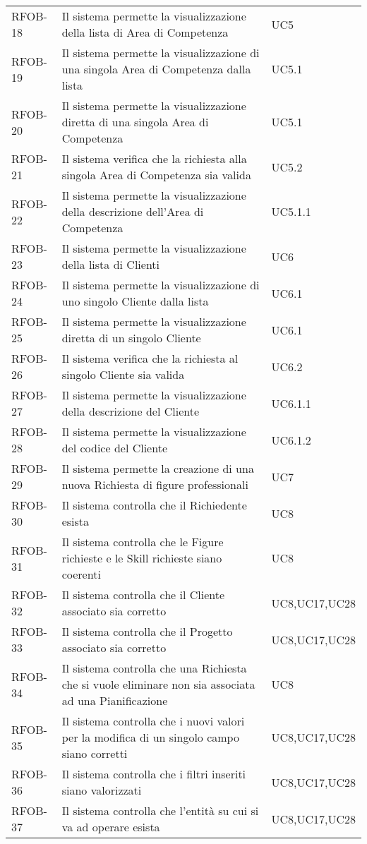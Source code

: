 \begin{center}
\begin{longtable}{p{2.0cm}|p{8cm}|p{2.7cm}}
RFOB-18  & Il sistema permette la visualizzazione della lista di Area di Competenza & UC5 \\ 
RFOB-19  & Il sistema permette la visualizzazione di una singola Area di Competenza dalla lista & UC5.1 \\ 
RFOB-20  & Il sistema permette la visualizzazione diretta di una singola Area di Competenza & UC5.1 \\ 
RFOB-21  & Il sistema verifica che la richiesta alla singola Area di Competenza sia valida & UC5.2 \\ 
RFOB-22  & Il sistema permette la visualizzazione della descrizione dell'Area di Competenza & UC5.1.1 \\ 
RFOB-23  & Il sistema permette la visualizzazione della lista di Clienti & UC6 \\ 
RFOB-24  & Il sistema permette la visualizzazione di uno singolo Cliente dalla lista & UC6.1 \\ 
RFOB-25  & Il sistema permette la visualizzazione diretta di un singolo Cliente & UC6.1 \\ 
RFOB-26  & Il sistema verifica che la richiesta al singolo Cliente sia valida & UC6.2 \\ 
RFOB-27  & Il sistema permette la visualizzazione della descrizione del Cliente & UC6.1.1\\ 
RFOB-28  & Il sistema permette la visualizzazione del codice del Cliente & UC6.1.2 \\ 

RFOB-29  & Il sistema permette la creazione di una nuova Richiesta di figure professionali & UC7 \\ 
RFOB-30  & Il sistema controlla che il Richiedente esista & UC8 \\ 
RFOB-31  & Il sistema controlla che le Figure richieste e le Skill richieste siano coerenti & UC8 \\ 
RFOB-32  & Il sistema controlla che il Cliente associato sia corretto & UC8,UC17,UC28 \\ 
RFOB-33  & Il sistema controlla che il Progetto associato sia corretto & UC8,UC17,UC28 \\ 
RFOB-34  & Il sistema controlla che una Richiesta che si vuole eliminare non sia associata ad una Pianificazione & UC8 \\ 
RFOB-35 & Il sistema controlla che i nuovi valori per la modifica di un singolo campo siano corretti & UC8,UC17,UC28\\
RFOB-36  & Il sistema controlla che i filtri inseriti siano valorizzati & UC8,UC17,UC28 \\ 
RFOB-37  & Il sistema controlla che l'entità su cui si va ad operare esista & UC8,UC17,UC28 \\ 



\end{longtable}
\end{center}
